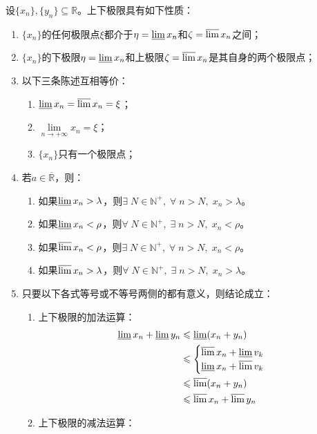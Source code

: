 \begin{property}\label{prop:LowerUpperLimit}
	设$\{x_n\},\{y_n\}\subseteq\mathbb{R}$。上下极限具有如下性质：
	\begin{enumerate}
		\item $\{x_n\}$的任何极限点$\xi$都介于$\eta=\varliminf x_n$和$\zeta=\varlimsup x_n$之间；
		\item $\{x_n\}$的下极限$\eta=\varliminf x_n$和上极限$\zeta=\varlimsup x_n$是其自身的两个极限点；
		\item 以下三条陈述互相等价：
		\begin{enumerate}
			\item $\varliminf x_n=\varlimsup x_n=\xi$；
			\item $\lim\limits_{n\to+\infty}x_n=\xi$；
			\item $\{x_n\}$只有一个极限点；
		\end{enumerate}
		\item 若$a\in\overline{\mathbb{R}}$，则：
		\begin{enumerate}
			\item 如果$\varliminf x_n>\lambda$，则$\exists\;N\in\mathbb{N}^+,\;\forall\;n>N,\;x_n>\lambda$。
			\item 如果$\varliminf x_n<\rho$，则$\forall\;N\in\mathbb{N}^+,\;\exists\;n>N,\;x_n<\rho$。
			\item 如果$\varlimsup x_n<\rho$，则$\exists\;N\in\mathbb{N}^+,\;\forall\;n>N,\;x_n<\rho$。
			\item 如果$\varlimsup x_n>\lambda$，则$\forall\;N\in\mathbb{N}^+,\;\exists\;n>N,\;x_n>\lambda$。
		\end{enumerate}
		\item 只要以下各式等号或不等号两侧的都有意义，则结论成立：
		\begin{enumerate}
			\item 上下极限的加法运算：
			\begin{align*}
				\varliminf x_n+\varliminf y_n &\leqslant\varliminf(x_n+y_n) \\
				&\leqslant
				\begin{cases}
					\varlimsup x_n+\varliminf v_k \\
					\varliminf x_n+\varlimsup v_k
				\end{cases} \\
				&\leqslant\varlimsup(x_n+y_n) \\
				&\leqslant\varlimsup x_n+\varlimsup y_n
			\end{align*}
			\item 上下极限的减法运算：
			\begin{gather*}

\end{gather*}
\end{enumerate}
\end{enumerate}
\end{property}
